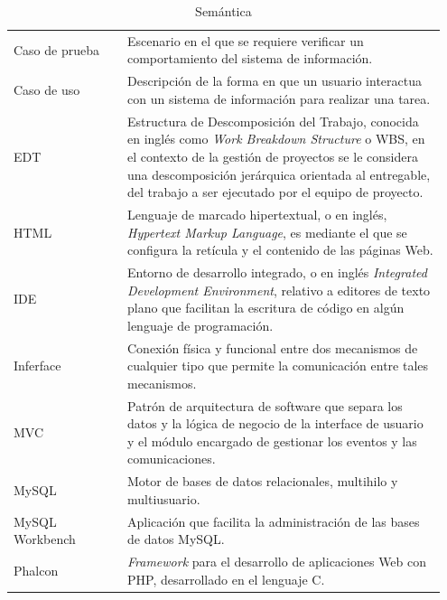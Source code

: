 \documentclass[a4paper, 9pt, conference]{article}              %
\theoremstyle{definition}
\begin{document}
\begin{table}[H]
	\centering
	\caption{Sem\'antica}
	\begin{tabular}{p{0.25\linewidth}p{0.7\linewidth}}
		\hdashline%
		Caso de prueba & Escenario en el que se requiere verificar un comportamiento del sistema de informaci\'on. \\
		\hdashline%
		Caso de uso & Descripci\'on de la forma en que un usuario interactua con un sistema de informaci\'on para realizar una tarea. \\
		\hdashline%
		EDT & Estructura de Descomposici\'on del Trabajo, conocida en ingl\'es como \emph{Work Breakdown Structure} o WBS, en el contexto de la gesti\'on de proyectos se le considera una descomposici\'on jer\'arquica orientada al entregable, del trabajo a ser ejecutado por el equipo de proyecto. \\
		\hdashline%
		HTML & Lenguaje de marcado hipertextual, o en ingl\'es, \emph{Hypertext Markup Language}, es mediante el que se configura la ret\'icula y el contenido de las p\'aginas Web. \\
		\hdashline%
		IDE & Entorno de desarrollo integrado, o en ingl\'es \emph{Integrated Development Environment}, relativo a editores de texto plano que facilitan la escritura de c\'odigo en alg\'un lenguaje de programaci\'on. \\
		\hdashline%
		Inferface & Conexi\'on f\'isica y funcional entre dos mecanismos de cualquier tipo que permite la comunicaci\'on entre tales mecanismos. \\
		\hdashline%
		MVC & Patr\'on de arquitectura de software que separa los datos y la l\'ogica de negocio de la interface de usuario y el m\'odulo encargado de gestionar los eventos y las comunicaciones. \\
		\hdashline%
		MySQL & Motor de bases de datos relacionales, multihilo y multiusuario. \\
		\hdashline%
		MySQL Workbench & Aplicaci\'on que facilita la administraci\'on de las bases de datos MySQL. \\
		\hdashline%
		Phalcon & \emph{Framework} para el desarrollo de aplicaciones Web con PHP, desarrollado en el lenguaje C. \\

\end{tabular}
\end{table}
\end{document}
